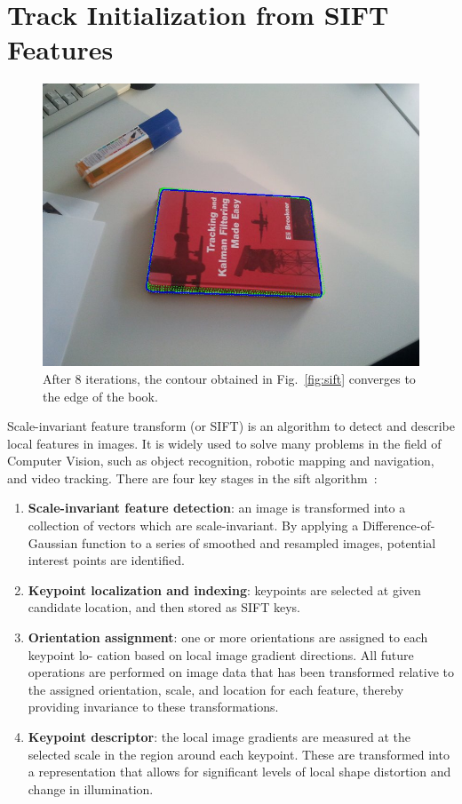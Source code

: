 \section{Track Initialization from SIFT Features}
\label{sec:sift_init}
\begin{figure}[htbp]
  \centering
\includegraphics[width=12cm]{images/sift_result.jpg}
\caption[The contour obtained using the CCD algorithm converges to the
edge of the book]{After 8 iterations, the contour obtained in Fig.~\ref{fig:sift} converges to the edge of the book.}
\label{fig:sift_result}
\end{figure}
Scale-invariant feature transform (or SIFT) is an algorithm to detect
and describe local features in images.  It is widely used to solve
many problems in the field of Computer Vision, such as object
recognition, robotic mapping and navigation, and video tracking. There are four key stages in the sift algorithm~\cite{lowe2004distinctive}:
\begin{enumerate}
\item \textbf{Scale-invariant feature detection}: an image is transformed into
  a collection of vectors which are scale-invariant. By applying a Difference-of-Gaussian
function to a series of smoothed and resampled images, potential
interest points are identified.
\item \textbf{Keypoint localization and indexing}: keypoints are selected at given
  candidate location, and then stored as SIFT keys.
\item \textbf{Orientation assignment}:  one or more orientations are assigned to each keypoint lo-
cation based on local image gradient directions. All future operations are performed
on image data that has been transformed relative to the assigned orientation, scale, and
location for each feature, thereby providing invariance to these transformations.
\item \textbf{Keypoint descriptor}: the local image gradients are measured at the selected scale
in the region around each keypoint. These are transformed into a representation that
allows for significant levels of local shape distortion and change in illumination.
\end{enumerate}


